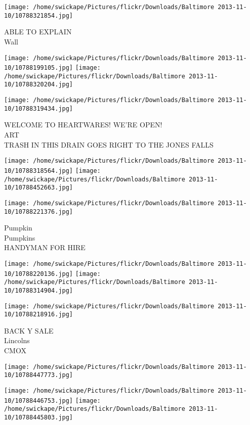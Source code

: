 \documentclass[10pt,letterpaper]{article}
\begin{document}
\vspace{0.25in}
\texttt{[image: /home/swickape/Pictures/flickr/Downloads/Baltimore 2013-11-10/10788321854.jpg]}

ABLE TO EXPLAIN\\
Wall
\pagebreak

\texttt{[image: /home/swickape/Pictures/flickr/Downloads/Baltimore 2013-11-10/10788199105.jpg]}
\texttt{[image: /home/swickape/Pictures/flickr/Downloads/Baltimore 2013-11-10/10788320204.jpg]}

\vspace{0.25in}
\texttt{[image: /home/swickape/Pictures/flickr/Downloads/Baltimore 2013-11-10/10788319434.jpg]}

WELCOME TO HEARTWARES!  WE'RE OPEN!\\
ART\\
TRASH IN THIS DRAIN GOES RIGHT TO THE JONES FALLS
\pagebreak

\texttt{[image: /home/swickape/Pictures/flickr/Downloads/Baltimore 2013-11-10/10788318564.jpg]}
\texttt{[image: /home/swickape/Pictures/flickr/Downloads/Baltimore 2013-11-10/10788452663.jpg]}

\vspace{0.25in}
\texttt{[image: /home/swickape/Pictures/flickr/Downloads/Baltimore 2013-11-10/10788221376.jpg]}

Pumpkin\\
Pumpkins\\
HANDYMAN FOR HIRE
\pagebreak

\texttt{[image: /home/swickape/Pictures/flickr/Downloads/Baltimore 2013-11-10/10788220136.jpg]}
\texttt{[image: /home/swickape/Pictures/flickr/Downloads/Baltimore 2013-11-10/10788314904.jpg]}

\texttt{[image: /home/swickape/Pictures/flickr/Downloads/Baltimore 2013-11-10/10788218916.jpg]}

BACK Y SALE\\
Lincolns\\
CMOX
\pagebreak

\texttt{[image: /home/swickape/Pictures/flickr/Downloads/Baltimore 2013-11-10/10788447773.jpg]}

\vspace{0.25in}
\texttt{[image: /home/swickape/Pictures/flickr/Downloads/Baltimore 2013-11-10/10788446753.jpg]}
\texttt{[image: /home/swickape/Pictures/flickr/Downloads/Baltimore 2013-11-10/10788445803.jpg]}
\end{document}
